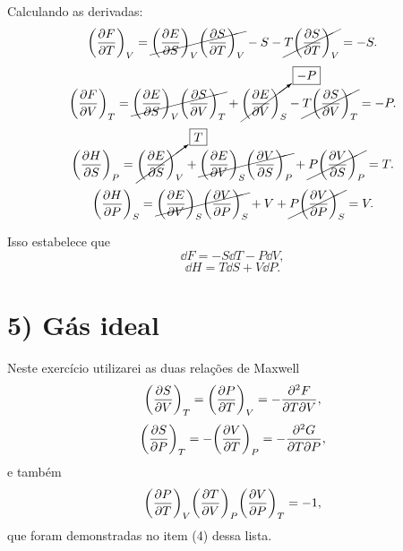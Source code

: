 \documentclass[a4paper,10pt]{article}
\begin{document}
\n

Calculando as derivadas:
$$
\qty(\pdv{F}{T})_{V} = \cancel{\qty(\pdv{E}{S})_V \qty(\pdv{S}{T})_V} - S - \cancel{T \qty(\pdv{S}{T})_V} = - S.
$$
$$
\qty(\pdv{F}{V})_{T} = \cancel{\qty(\pdv{E}{S})_V \qty(\pdv{S}{V})_T} + \cancelto{\boxed{-P}}{\qty(\pdv{E}{V})_S} - \cancel{T \qty(\pdv{S}{V})_T} = -P.
$$
$$
\qty(\pdv{H}{S})_{P} = \cancelto{\boxed{T}}{\qty(\pdv{E}{S})_V} + \cancel{\qty(\pdv{E}{V})_S \qty(\pdv{V}{S})_P} + \cancel{P \qty(\pdv{V}{S})_P} = T.
$$
$$
\qty(\pdv{H}{P})_{S} = \cancel{\qty(\pdv{E}{V})_S \qty(\pdv{V}{P})_S} + V + \cancel{P \qty(\pdv{V}{P})_S} = V.
$$

Isso estabelece que
$$
\boxed{ \dd{F} = -S \dd{T} - P \dd{V}, }
$$
$$
\boxed{ \dd{H} = T \dd{S} + V \dd{P}. }
$$


\pagebreak

\section*{5) Gás ideal}

Neste exercício utilizarei as duas relações de Maxwell
\begin{equation} \label{eq:maxwell_1}
\qty(\pdv{S}{V})_{T} = \qty(\pdv{P}{T})_{V} = - \pdv{F}{T}{V},
\end{equation}
\begin{equation} \label{eq:maxwell_2}
\qty(\pdv{S}{P})_{T} = - \qty(\pdv{V}{T})_{P} = - \pdv{G}{T}{P},
\end{equation}
e também
\begin{equation} \label{eq:ptvp}
\qty(\pdv{P}{T})_{V} \qty(\pdv{T}{V})_{P} \qty(\pdv{V}{P})_{T} = -1,
\end{equation}
que foram demonstradas no item (4) dessa lista.

\n
\end{document}
